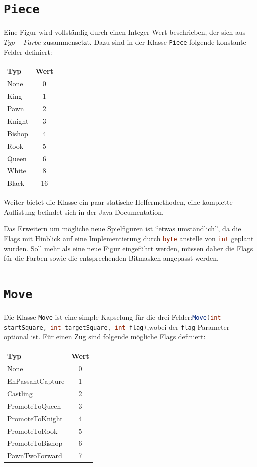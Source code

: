 \documentclass{scrreprt}
\newcommand{\lstinlinejava}[1]{\lstinline[language=java]{#1}}
\newcommand{\lstj}[1]{\lstinlinejava{#1}}
\begin{document}
\section{\lstj{Piece}}
Eine Figur wird vollständig durch einen Integer Wert beschrieben, der sich aus $Typ + Farbe$ zusammensetzt. Dazu sind in der Klasse \lstinlinejava{Piece} folgende konstante Felder definiert:

\begin{center}
\begin{tabular}{|l|c|}
  Typ  & Wert \\
  \hline
  None       & 0 \\
  King       & 1 \\
  Pawn       & 2\\
  Knight     & 3\\
  Bishop     & 4\\
  Rook       & 5\\
  Queen      & 6\\
  White      & 8\\
  Black      & 16\\
\end{tabular}
\end{center}

Weiter bietet die Klasse ein paar statische Helfermethoden, eine komplette Auflistung befindet sich in der Java Documentation.

Das Erweitern um mögliche neue Spielfiguren ist ``etwas umständlich'', da die Flags mit Hinblick auf eine Implementierung durch \lstj{byte} anstelle von \lstj{int} geplant wurden. Soll mehr als eine neue Figur eingeführt werden, müssen daher die Flags für die Farben sowie die entsprechenden Bitmasken angepasst werden.


\section{\lstj{Move}}

Die Klasse \lstj{Move} ist eine simple Kapselung für die drei Felder:\newline \lstj{Move(int startSquare, int targetSquare, int flag)},\newline wobei der \lstj{flag}-Parameter optional ist. Für einen Zug sind folgende mögliche Flags definiert:

\begin{center}
\begin{tabular}{|l|c|}
  Typ  & Wert \\
  \hline
  None & 0 \\
  EnPassantCapture & 1\\
  Castling & 2\\
  PromoteToQueen & 3\\
  PromoteToKnight & 4\\
  PromoteToRook & 5\\
  PromoteToBishop & 6\\
  PawnTwoForward & 7\\
\end{tabular}
\end{center}
  
\end{document}
